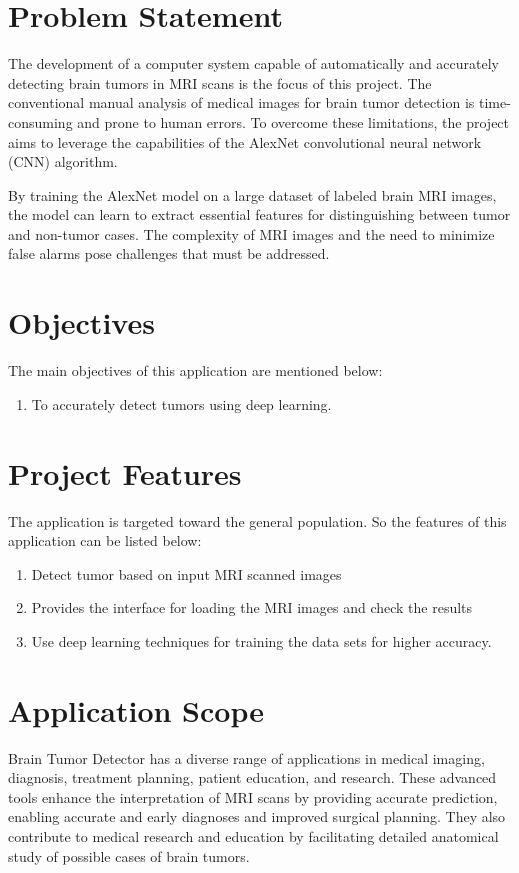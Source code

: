 \section{Problem Statement}
\vspace{-18pt}
The development of a computer system capable of automatically and accurately detecting brain tumors in MRI scans is the focus of this project. The conventional manual analysis of medical images for brain tumor detection is time-consuming and prone to human errors. To overcome these limitations, the project aims to leverage the capabilities of the AlexNet convolutional neural network (CNN) algorithm.
\par
By training the AlexNet model on a large dataset of labeled brain MRI images, the model can learn to extract essential features for distinguishing between tumor and non-tumor cases. The complexity of MRI images and the need to minimize false alarms pose challenges that must be addressed.

\section{Objectives}
\vspace{-18pt}
The main objectives of this application are mentioned below:
\vspace{-18pt}
\begin{enumerate}[label=\roman*.]
\item To accurately detect tumors using deep learning.

\end{enumerate}
\section{Project Features}
\vspace{-18pt}
The application is targeted toward the general population. So the features of this application can be listed below:
\vspace{-18pt}
\begin{enumerate}[label=\roman*.]
\item Detect tumor based on input MRI scanned images
\item Provides the interface for loading the MRI images and check the results
\item Use deep learning techniques for training the data sets for higher accuracy.
\end{enumerate}
\section{Application Scope}
\vspace{-18pt}
Brain Tumor Detector has a diverse range of applications in medical imaging, diagnosis, treatment planning, patient education, and research. These advanced tools enhance the interpretation of MRI scans by providing accurate prediction, enabling accurate and early diagnoses and improved surgical planning\cite{Saeedi2023}. They also contribute to medical research and education by facilitating detailed anatomical study of possible cases of brain tumors.
